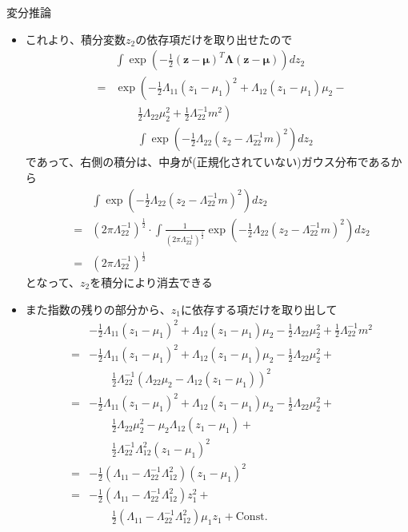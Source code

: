\documentclass[dvipdfmx,notheorems,t]{beamer}
\begin{document}
\begin{frame}{変分推論}
\begin{itemize}
\begin{itemize}
		\item これより、積分変数$z_2$の依存項だけを取り出せたので
		\begin{eqnarray}
			&& \int \exp \left( -\frac{1}{2} (\bm{z} - \bm{\mu})^T \bm{\Lambda} (\bm{z} - \bm{\mu}) \right) dz_2 \nonumber \\
			&=& \exp \left( -\frac{1}{2} \Lambda_{11} (z_1 - \mu_1)^2 + \Lambda_{12} (z_1 - \mu_1) \mu_2 - \right. \nonumber \\
			&& \qquad \left. \frac{1}{2} \Lambda_{22} \mu_2^2 + \frac{1}{2} \Lambda_{22}^{-1} m^2 \right) \nonumber \\
			&& \qquad \int \exp \left( - \frac{1}{2} \Lambda_{22} \left( z_2 - \Lambda_{22}^{-1} m \right)^2 \right) dz_2
		\end{eqnarray}
		であって、右側の積分は、中身が(正規化されていない)ガウス分布であるから
		\begin{eqnarray}
			&& \int \exp \left( - \frac{1}{2} \Lambda_{22} \left( z_2 - \Lambda_{22}^{-1} m \right)^2 \right) dz_2 \nonumber \\
			&=& (2\pi \Lambda_{22}^{-1})^\frac{1}{2} \cdot \int \frac{1}{(2\pi \Lambda_{22}^{-1})^\frac{1}{2}} \exp \left( - \frac{1}{2} \Lambda_{22} \left( z_2 - \Lambda_{22}^{-1} m \right)^2 \right) dz_2 \nonumber \\
			&=& \left( 2\pi \Lambda_{22}^{-1} \right)^\frac{1}{2}
		\end{eqnarray}
		となって、$z_2$を積分により消去できる
		\newline
		
		\item また指数の残りの部分から、$z_1$に依存する項だけを取り出して
		\begin{eqnarray}
			&& -\frac{1}{2} \Lambda_{11} (z_1 - \mu_1)^2 + \Lambda_{12} (z_1 - \mu_1) \mu_2 - \frac{1}{2} \Lambda_{22} \mu_2^2 + \frac{1}{2} \Lambda_{22}^{-1} m^2 \nonumber \\
			&=& -\frac{1}{2} \Lambda_{11} (z_1 - \mu_1)^2 + \Lambda_{12} (z_1 - \mu_1) \mu_2 - \frac{1}{2} \Lambda_{22} \mu_2^2 + \nonumber \\
			&& \qquad \frac{1}{2} \Lambda_{22}^{-1} \left( \Lambda_{22} \mu_2 - \Lambda_{12} (z_1 - \mu_1) \right)^2 \nonumber \\
			&=& -\frac{1}{2} \Lambda_{11} (z_1 - \mu_1)^2 + \Lambda_{12} (z_1 - \mu_1) \mu_2 - \frac{1}{2} \Lambda_{22} \mu_2^2 + \nonumber \\
			&& \qquad \frac{1}{2} \Lambda_{22} \mu_2^2 - \mu_2 \Lambda_{12} (z_1 - \mu_1) + \nonumber \\
			&& \qquad \frac{1}{2} \Lambda_{22}^{-1} \Lambda_{12}^2 (z_1 - \mu_1)^2 \\
			&=& -\frac{1}{2} \left( \Lambda_{11} - \Lambda_{22}^{-1} \Lambda_{12}^2 \right) (z_1 - \mu_1)^2 \\
			&=& -\frac{1}{2} \left( \Lambda_{11} - \Lambda_{22}^{-1} \Lambda_{12}^2 \right) z_1^2 + \nonumber \\
			&& \qquad \frac{1}{2} \left( \Lambda_{11} - \Lambda_{22}^{-1} \Lambda_{12}^2 \right) \mu_1 z_1 + \mathrm{Const.}
		\end{eqnarray}
		

\end{itemize}
\end{itemize}
\end{frame}
\end{document}
